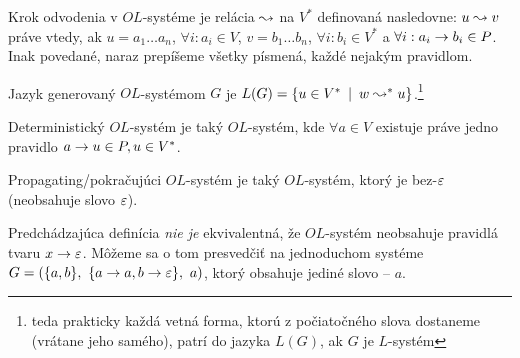 \begin{definicia}
  Krok odvodenia v $OL$-systéme je relácia $\leadsto$ na $V^{*}$ definovaná
  nasledovne: $u\leadsto v$ práve vtedy, ak $u=a_{1} \dots a_{n}$,
  $\forall i: a_{i} \in V$, $v=b_{1} \dots b_{n}$, 
  $\forall i: b_{i} \in V^{*}$ a 
  $\forall i: a_{i} \rightarrow b_{i} \in P$. 
  Inak povedané, naraz prepíšeme všetky písmená, každé nejakým
  pravidlom.
\end{definicia}

\begin{definicia}
  Jazyk generovaný $OL$-systémom $G$ je 
  $L(G)=\{u\in V^{*} \enspace |\enspace w \leadsto^{*} u\}$.\footnote{
    teda prakticky
    každá vetná forma, ktorú z
    počiatočného slova dostaneme (vrátane jeho samého), patrí do
    jazyka $L(G)$, ak $G$ je $L$-systém
  }
\end{definicia}

\begin{definicia}
  Deterministický $OL$-systém je taký $OL$-systém,
  kde $\forall a\in V$ existuje práve jedno pravidlo
  $a \rightarrow u\in P, u\in V^*$.
\end{definicia}

\begin{definicia}
  Propagating/pokračujúci $OL$-systém je taký $OL$-systém, ktorý
  je bez-$\varepsilon$ (neobsahuje slovo $\varepsilon$).
\end{definicia}

\begin{poznamka}
  Predchádzajúca definícia \emph{nie je} ekvivalentná, že
  $OL$-systém neobsahuje pravidlá tvaru $x \rightarrow \varepsilon$.
  Môžeme sa o tom presvedčiť na jednoduchom systéme
  $G=(\{a,b\},\ \{a \pravidlo a, b \pravidlo \eps\},\ a)$, ktorý
  obsahuje jediné slovo -- $a$.
\end{poznamka}

